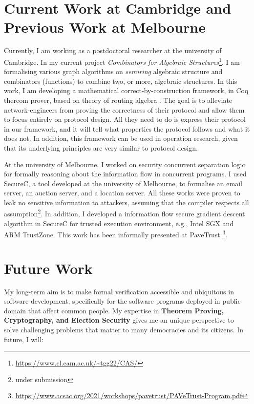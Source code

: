 \documentclass[a4paper]{article}
\begin{document}
\section{Current Work at Cambridge and Previous Work at Melbourne}
Currently, I am working as a postdoctoral researcher at the university of Cambridge. 
In my current project \emph{Combinators for Algebraic Structures}\footnote{\url{https://www.cl.cam.ac.uk/~tgg22/CAS/}}, 
I am formalising various graph algorithms on \emph{semiring} algebraic 
structure and combinators (functions) to 
combine two, or more, algebraic structures. In this work, I am developing 
a mathematical correct-by-construction \cite{10.1007/978-3-319-66107-0_26} 
framework, in Coq thereom prover, based on theory of routing algebra 
\cite{10.1093/imamat/15.2.161, 10.1145/1080091.1080094}. The goal is to alleviate network-engineers from 
proving the correctness of their protocol and allow them to focus entirely on protocol design.
All they need to do is express their protocol in our
framework, and it will tell what properties the protocol follows and what it does not. 
In addition, this framework can be used in operation
research, given that its underlying principles are 
very similar to protocol design.



At the university of Melbourne, I worked on 
security concurrent separation logic for formally reasoning about the information flow in concurrent programs. 
I used SecureC, a tool developed at the university of Melbourne, to formalise an email server, 
an auction server, and a location server. All these works were proven to leak no sensitive 
information to attackers, assuming that the compiler respects all assumption\footnote{under submission}. 
In addition, I developed a information flow secure gradient descent algorithm in SecureC for 
trusted execution environment, e.g., Intel SGX and ARM TrustZone. This work has been 
informally presented at PaveTrust
\footnote{\url{https://www.acsac.org/2021/workshops/pavetrust/PAVeTrust-Program.pdf}}.


\section{Future Work}
My long-term aim is to make formal verification accessible and ubiquitous in 
software development, specifically for the software programs deployed in public domain
that affect common people.
My expertise in \textbf{Theorem Proving, Cryptography, and Election Security}
gives me an unique perspective to solve challenging problems that matter to many democracies 
and its citizens. In future, I will:
\end{document}

